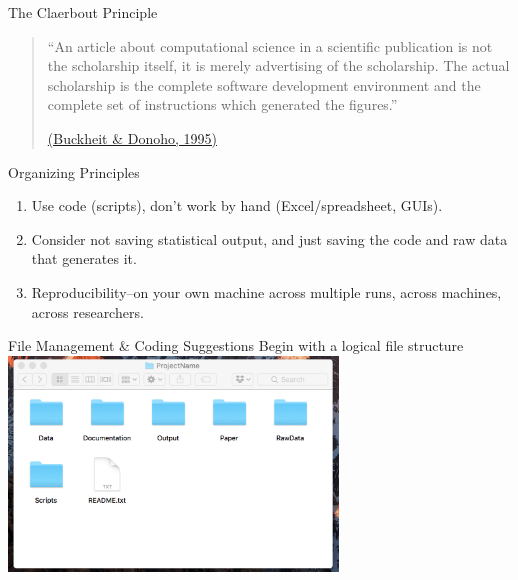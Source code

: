 \documentclass{beamer}
\begin{document}
\begin{frame}{The Claerbout Principle}

\begin{quote}``An article about computational science in a scientific publication is not the scholarship itself, it is merely advertising of the scholarship. The actual scholarship is the complete software development environment and the complete set of instructions which generated the figures.'' 

\href{https://statweb.stanford.edu/~wavelab/Wavelab_850/wavelab.pdf}{(Buckheit \& Donoho, 1995)}\end{quote}
\end{frame}

\begin{frame}{Organizing Principles}
\begin{enumerate}
	\item Use code (scripts), don't work by hand (Excel/spreadsheet, GUIs).
	\item Consider not saving statistical output, and just saving the code and raw data that generates it.
	\item Reproducibility--on your own machine across multiple runs, across machines, across researchers. 
\end{enumerate}
\end{frame}

\begin{frame}{File Management \& Coding Suggestions}
Begin with a logical file structure 
\includegraphics[height=2.25in]{../Images/files.png}
\end{frame}
\end{document}
